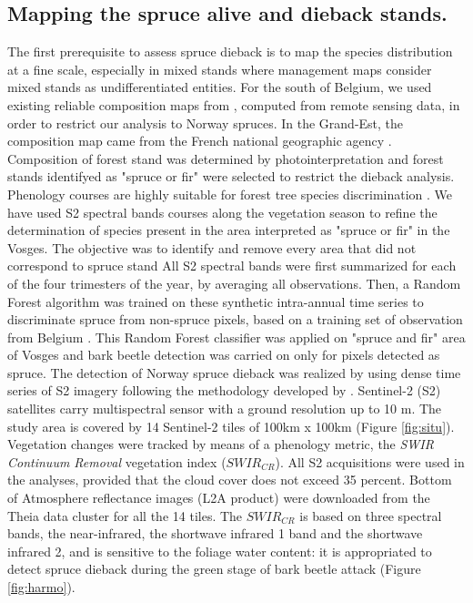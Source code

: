 \documentclass[3p,procedia]{elsarticle}
\begin{document}
\subsection{Mapping the spruce alive and dieback stands.}
The first prerequisite to assess spruce dieback is to map the species distribution at a fine scale, especially in mixed stands where management maps consider mixed stands as undifferentiated entities.
For the south of Belgium, we used existing reliable composition maps from \cite{bolyn_mapping_2022}, computed from remote sensing data, in order to restrict our analysis to Norway spruces.
In the Grand-Est, the composition map came from the French national geographic agency \citep{IGN_bd_2018}. 
Composition of forest stand was determined by photointerpretation and forest stands identifyed as "spruce or fir"  were selected to restrict the dieback analysis.
Phenology courses are highly suitable for forest tree species discrimination \citep{lisein_discrimination_2015,grabska_forest_2019,ma_tree_2021}.
We have used S2 spectral bands courses along the vegetation season to refine the determination of species present in the area interpreted as "spruce or fir" in the Vosges.
The objective was to identify and remove every area that did not correspond to spruce stand
All S2 spectral bands were first summarized for each of the four trimesters of the year, by averaging all observations.
Then, a Random Forest algorithm was trained on these synthetic intra-annual time series to discriminate spruce from non-spruce pixels, based on a training set of observation from Belgium \citep{bolyn_forest_2018}.
This Random Forest classifier was applied on "spruce and fir" area of Vosges and bark beetle detection was carried on only for pixels detected as spruce. 
The detection of Norway spruce dieback was realized by using dense time series of S2 imagery following the methodology developed by \cite{dutrieux_package_2021}.
Sentinel-2 (S2) satellites carry multispectral sensor with a ground resolution up to 10 m.
The study area is covered by 14 Sentinel-2 tiles of 100km x 100km (Figure \ref{fig:situ}).  
Vegetation changes were tracked by means of a phenology metric, the \textit{SWIR Continuum Removal} vegetation index ($SWIR_{CR}$).
All S2 acquisitions were used in the analyses, provided that the cloud cover does not exceed 35 percent. 
Bottom of Atmosphere reflectance images (L2A product) were downloaded from the Theia data cluster \citep{theia_team} for all the 14 tiles.
The $SWIR_{CR}$ is based on three spectral bands, the near-infrared, the shortwave infrared 1 band and the shortwave infrared 2, and is sensitive to the foliage water content: it is appropriated to detect spruce dieback during the green stage of bark beetle attack (Figure \ref{fig:harmo}).
\end{document}

